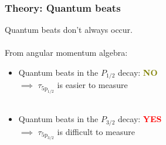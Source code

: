 \documentclass{beamer}
\theoremstyle{definition}
\newcommand{\pOne}{\text{5p}_\text{1/2}}
\newcommand{\pThree}{\text{5p}_\text{3/2}}
\begin{document}
\begin{frame}
\frametitle{Theory: Quantum beats}


Quantum beats don't always occur.\\
$\,$\\


From angular momentum algebra:

\begin{itemize}
	\item Quantum beats in the $P_{1/2}$ decay: \textbf{\textcolor{olive}{NO}}\\
	
	$\implies$ $\tau_{\pOne}$ is easier to measure\\
	$\,$\\
	
	\item Quantum beats in the $P_{3/2}$ decay: \textbf{\textcolor{red}{YES}}\\
	
	$\implies$ $\tau_{\pThree}$ is difficult to measure
	
\end{itemize}


\end{frame}
\end{document}
